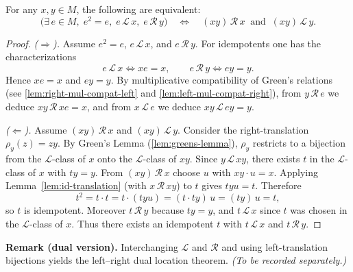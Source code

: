 \begin{proposition}
\label{prop:location}
For any \(x,y\in M\), the following are equivalent:
\[
\bigl(\exists\, e\in M,\; e^2=e,\; e \,\mathcal L\, x,\; e \,\mathcal R\, y\bigr)
\quad\Longleftrightarrow\quad
(xy) \,\mathcal R\, x \ \text{ and }\ (xy) \,\mathcal L\, y.
\]
\end{proposition}

\begin{proof}
\emph{(\(\Rightarrow\)).}
Assume \(e^2=e\), \(e \,\mathcal L\, x\), and \(e \,\mathcal R\, y\).
For idempotents one has the characterizations
\[
e \,\mathcal L\, x \iff x e = x, \qquad e \,\mathcal R\, y \iff e y = y.
\]
Hence \(x e = x\) and \(e y = y\).
By multiplicative compatibility of Green’s relations (see
\ref{lem:right-mul-compat-left} and \ref{lem:left-mul-compat-right}),
from \(y \,\mathcal R\, e\) we deduce \(x y \,\mathcal R\, x e = x\),
and from \(x \,\mathcal L\, e\) we deduce \(x y \,\mathcal L\, e y = y\).

\smallskip
\emph{(\(\Leftarrow\)).}
Assume \((x y)\,\mathcal R\, x\) and \((x y)\,\mathcal L\, y\).
Consider the right-translation \(\rho_y(z)=z y\).
By Green’s Lemma (\ref{lem:greens-lemma}), \(\rho_y\) restricts to a bijection from the \(\mathcal L\)-class of \(x\)
onto the \(\mathcal L\)-class of \(x y\). Since \(y \,\mathcal L\, x y\), there exists \(t\) in the \(\mathcal L\)-class of \(x\) with
\(t y = y\).
From \((x y)\,\mathcal R\, x\) choose \(u\) with \(x y \cdot u = x\).
Applying Lemma~\ref{lem:id-translation} (with \(x \,\mathcal R\, x y\)) to \(t\) gives
\(t y u = t\). Therefore
\[
t^2 = t\cdot t = t\cdot (t y u) = (t\cdot t y)\,u = (t y)\,u = t,
\]
so \(t\) is idempotent. Moreover \(t \,\mathcal R\, y\) because \(t y = y\), and \(t \,\mathcal L\, x\) since \(t\) was chosen in the \(\mathcal L\)-class of \(x\).
Thus there exists an idempotent \(t\) with \(t \,\mathcal L\, x\) and \(t \,\mathcal R\, y\).
\end{proof}

\noindent\textbf{Remark (dual version).}
Interchanging \(\mathcal L\) and \(\mathcal R\) and using left-translation bijections yields the left–right dual location theorem.  \emph{(To be recorded separately.)}
